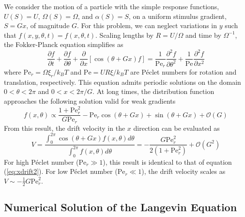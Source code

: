 \begin{appendices}
We consider the motion of a particle with the simple response functions, $U(S)=U$, $\Omega(S)=\Omega$, and  $\alpha(S)=S$, on a uniform stimulus gradient, $S=G x$, of magnitude $G$. For this problem, we can neglect variations in $y$ such that $f(x,y,\theta,t)=f(x,\theta,t)$.  Scaling lengths by $R=U/\Omega$ and time by $\Omega^{-1}$, the Fokker-Planck equation simplifies as
\begin{equation}
    \frac{\partial f}{\partial t} + \frac{\partial f}{\partial \theta} + \frac{\partial}{\partial x}\left[\cos(\theta+Gx)f\right] =  \frac{1}{\text{Pe}_r}\frac{\partial^2f}{\partial \theta^2} + \frac{1}{\text{Pe}}\frac{\partial^2 f}{\partial x^2}
\end{equation}
where $\text{Pe}_r = \Omega \xi_r/k_B T$ and $\text{Pe}=U R \xi/k_B T$ are P\'eclet numbers for rotation and translation, respectively.  This equation admits periodic solutions on the domain $0<\theta<2\pi$ and $0<x<2\pi/G$. At long times, the distribution function approaches the following solution valid for weak gradients
\begin{equation}
    f(x,\theta) \propto \frac{1 + \text{Pe}_r^2}{G\text{Pe}_r} - \text{Pe}_r \cos (\theta + G x) + \sin (\theta + G x) + \mathcal{O}(G)
\end{equation}
From this result, the drift velocity in the $x$ direction can be evaluated as 
\begin{equation}
    V = \frac{\int_0^{2\pi} \cos(\theta+G x)f(x,\theta) d\theta}{\int_0^{2\pi} f(x,\theta) d\theta} = -\frac{G \text{Pe}_r^2}{2 (1 + \text{Pe}_r^2)}  + \mathcal{O}(G^2)
\end{equation}
For high P\'eclet number ($\text{Pe}_r\gg1$), this result is identical to that of equation (\ref{eq:xdrift2}).  For low P\'eclet number ($\text{Pe}_r\ll 1$), the drift velocity scales as $V\sim -\tfrac{1}{2}G\text{Pe}_r^2$.

\subsection{Numerical Solution of the Langevin Equation}


\end{appendices}
